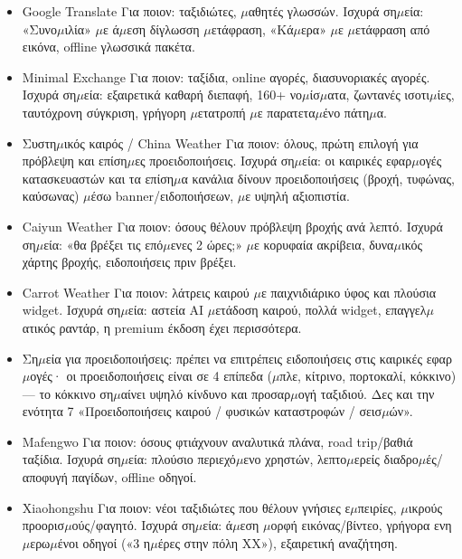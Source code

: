 
\begin{itemize}
  \item Google Translate Για ποιον: ταξιδιώτες, $\mu$αθητές γλωσσών. Ισχυρά ση$\mu$εία: «Συνο$\mu$ιλία» $\mu$ε ά$\mu$εση δίγλωσση $\mu$ετάφραση, «Κά$\mu$ερα» $\mu$ε $\mu$ετάφραση από εικόνα, offline γλωσσικά πακέτα.
\end{itemize}


\begin{itemize}
  \item Minimal Exchange Για ποιον: ταξίδια, online αγορές, διασυνοριακές αγορές. Ισχυρά ση$\mu$εία: εξαιρετικά καθαρή διεπαφή, 160+ νο$\mu$ίσ$\mu$ατα, ζωντανές ισοτι$\mu$ίες, ταυτόχρονη σύγκριση, γρήγορη $\mu$ετατροπή $\mu$ε παρατετα$\mu$ένο πάτη$\mu$α.
\end{itemize}


\begin{itemize}
  \item Συστη$\mu$ικός καιρός / China Weather Για ποιον: όλους, πρώτη επιλογή για πρόβλεψη και επίση$\mu$ες προειδοποιήσεις. Ισχυρά ση$\mu$εία: οι καιρικές εφαρ$\mu$ογές κατασκευαστών και τα επίση$\mu$α κανάλια δίνουν προειδοποιήσεις (βροχή, τυφώνας, καύσωνας) $\mu$έσω banner/ειδοποιήσεων, $\mu$ε υψηλή αξιοπιστία.
  \item Caiyun Weather Για ποιον: όσους θέλουν πρόβλεψη βροχής ανά λεπτό. Ισχυρά ση$\mu$εία: «θα βρέξει τις επό$\mu$ενες 2 ώρες;» $\mu$ε κορυφαία ακρίβεια, δυνα$\mu$ικός χάρτης βροχής, ειδοποιήσεις πριν βρέξει.
  \item Carrot Weather Για ποιον: λάτρεις καιρού $\mu$ε παιχνιδιάρικο ύφος και πλούσια widget. Ισχυρά ση$\mu$εία: αστεία AI $\mu$ετάδοση καιρού, πολλά widget, επαγγελ$\mu$ατικός ραντάρ, η premium έκδοση έχει περισσότερα.
  \item Ση$\mu$εία για προειδοποιήσεις: πρέπει να επιτρέπεις ειδοποιήσεις στις καιρικές εφαρ$\mu$ογές· οι προειδοποιήσεις είναι σε 4 επίπεδα ($\mu$πλε, κίτρινο, πορτοκαλί, κόκκινο) — το κόκκινο ση$\mu$αίνει υψηλό κίνδυνο και προσαρ$\mu$ογή ταξιδιού. Δες και την ενότητα 7 «Προειδοποιήσεις καιρού / φυσικών καταστροφών / σεισ$\mu$ών».
\end{itemize}


\begin{itemize}
  \item Mafengwo Για ποιον: όσους φτιάχνουν αναλυτικά πλάνα, road trip/βαθιά ταξίδια. Ισχυρά ση$\mu$εία: πλούσιο περιεχό$\mu$ενο χρηστών, λεπτο$\mu$ερείς διαδρο$\mu$ές/αποφυγή παγίδων, offline οδηγοί.
  \item Xiaohongshu Για ποιον: νέοι ταξιδιώτες που θέλουν γνήσιες ε$\mu$πειρίες, $\mu$ικρούς προορισ$\mu$ούς/φαγητό. Ισχυρά ση$\mu$εία: ά$\mu$εση $\mu$ορφή εικόνας/βίντεο, γρήγορα ενη$\mu$ερω$\mu$ένοι οδηγοί («3 η$\mu$έρες στην πόλη XX»), εξαιρετική αναζήτηση.
\end{itemize}

